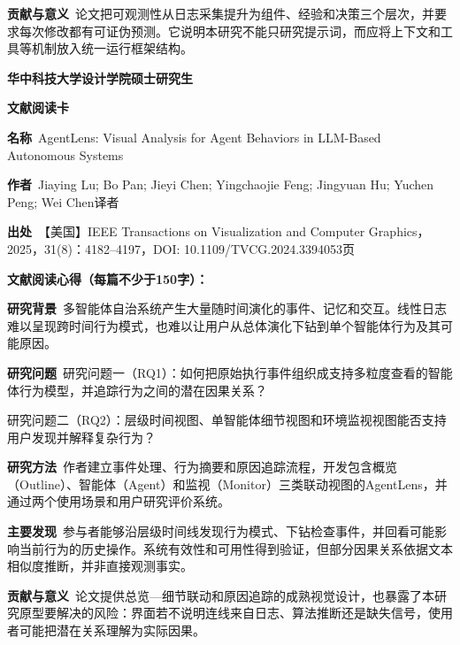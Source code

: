 \noindent\textbf{贡献与意义}\ 论文把可观测性从日志采集提升为组件、经验和决策三个层次，并要求每次修改都有可证伪预测。它说明本研究不能只研究提示词，而应将上下文和工具等机制放入统一运行框架结构。\par
\clearpage
\begin{center}
{\songti\bfseries\fontsize{18.5pt}{27.75pt}\selectfont 华中科技大学设计学院硕士研究生\par}
{\songti\bfseries\fontsize{18.5pt}{27.75pt}\selectfont 文献阅读卡\par}
\end{center}
\vspace{0.25em}
\noindent\underline{}\par
\vspace{0.35em}
\noindent\textbf{名称}\ AgentLens: Visual Analysis for Agent Behaviors in LLM-Based Autonomous Systems\par
\noindent\textbf{作者}\ Jiaying Lu; Bo Pan; Jieyi Chen; Yingchaojie Feng; Jingyuan Hu; Yuchen Peng; Wei Chen\quad 译者\par
\noindent\textbf{出处}\ 【美国】IEEE Transactions on Visualization and Computer Graphics，2025，31(8)：4182–4197，DOI: 10.1109/TVCG.2024.3394053\quad 页\par
\vspace{0.35em}
\noindent\textbf{文献阅读心得（每篇不少于150字）：}\par
\noindent\textbf{研究背景}\ 多智能体自治系统产生大量随时间演化的事件、记忆和交互。线性日志难以呈现跨时间行为模式，也难以让用户从总体演化下钻到单个智能体行为及其可能原因。\par
\noindent\textbf{研究问题}\ 研究问题一（RQ1）：如何把原始执行事件组织成支持多粒度查看的智能体行为模型，并追踪行为之间的潜在因果关系？\par
研究问题二（RQ2）：层级时间视图、单智能体细节视图和环境监视视图能否支持用户发现并解释复杂行为？\par
\noindent\textbf{研究方法}\ 作者建立事件处理、行为摘要和原因追踪流程，开发包含概览（Outline）、智能体（Agent）和监视（Monitor）三类联动视图的AgentLens，并通过两个使用场景和用户研究评价系统。\par
\noindent\textbf{主要发现}\ 参与者能够沿层级时间线发现行为模式、下钻检查事件，并回看可能影响当前行为的历史操作。系统有效性和可用性得到验证，但部分因果关系依据文本相似度推断，并非直接观测事实。\par
\noindent\textbf{贡献与意义}\ 论文提供总览—细节联动和原因追踪的成熟视觉设计，也暴露了本研究原型要解决的风险：界面若不说明连线来自日志、算法推断还是缺失信号，使用者可能把潜在关系理解为实际因果。\par
